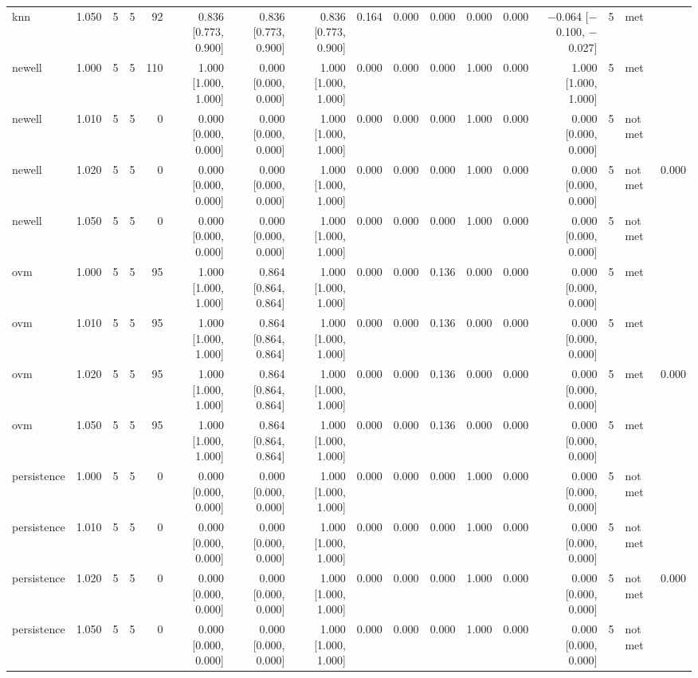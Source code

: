 \begin{table}[htbp]
{\begin{tabular}{lrrrrrrrrrrrrrrlr}
knn & 1.050 & 5 & 5 & 92 & 0.836 [0.773, 0.900] & 0.836 [0.773, 0.900] & 0.836 [0.773, 0.900] & 0.164 & 0.000 & 0.000 & 0.000 & 0.000 & $-$0.064 [$-$0.100, $-$0.027] & 5 & met &  \\
newell & 1.000 & 5 & 5 & 110 & 1.000 [1.000, 1.000] & 0.000 [0.000, 0.000] & 1.000 [1.000, 1.000] & 0.000 & 0.000 & 0.000 & 1.000 & 0.000 & 1.000 [1.000, 1.000] & 5 & met &  \\
newell & 1.010 & 5 & 5 & 0 & 0.000 [0.000, 0.000] & 0.000 [0.000, 0.000] & 1.000 [1.000, 1.000] & 0.000 & 0.000 & 0.000 & 1.000 & 0.000 & 0.000 [0.000, 0.000] & 5 & not met &  \\
newell & 1.020 & 5 & 5 & 0 & 0.000 [0.000, 0.000] & 0.000 [0.000, 0.000] & 1.000 [1.000, 1.000] & 0.000 & 0.000 & 0.000 & 1.000 & 0.000 & 0.000 [0.000, 0.000] & 5 & not met & 0.000 \\
newell & 1.050 & 5 & 5 & 0 & 0.000 [0.000, 0.000] & 0.000 [0.000, 0.000] & 1.000 [1.000, 1.000] & 0.000 & 0.000 & 0.000 & 1.000 & 0.000 & 0.000 [0.000, 0.000] & 5 & not met &  \\
ovm & 1.000 & 5 & 5 & 95 & 1.000 [1.000, 1.000] & 0.864 [0.864, 0.864] & 1.000 [1.000, 1.000] & 0.000 & 0.000 & 0.136 & 0.000 & 0.000 & 0.000 [0.000, 0.000] & 5 & met &  \\
ovm & 1.010 & 5 & 5 & 95 & 1.000 [1.000, 1.000] & 0.864 [0.864, 0.864] & 1.000 [1.000, 1.000] & 0.000 & 0.000 & 0.136 & 0.000 & 0.000 & 0.000 [0.000, 0.000] & 5 & met &  \\
ovm & 1.020 & 5 & 5 & 95 & 1.000 [1.000, 1.000] & 0.864 [0.864, 0.864] & 1.000 [1.000, 1.000] & 0.000 & 0.000 & 0.136 & 0.000 & 0.000 & 0.000 [0.000, 0.000] & 5 & met & 0.000 \\
ovm & 1.050 & 5 & 5 & 95 & 1.000 [1.000, 1.000] & 0.864 [0.864, 0.864] & 1.000 [1.000, 1.000] & 0.000 & 0.000 & 0.136 & 0.000 & 0.000 & 0.000 [0.000, 0.000] & 5 & met &  \\
persistence & 1.000 & 5 & 5 & 0 & 0.000 [0.000, 0.000] & 0.000 [0.000, 0.000] & 1.000 [1.000, 1.000] & 0.000 & 0.000 & 0.000 & 1.000 & 0.000 & 0.000 [0.000, 0.000] & 5 & not met &  \\
persistence & 1.010 & 5 & 5 & 0 & 0.000 [0.000, 0.000] & 0.000 [0.000, 0.000] & 1.000 [1.000, 1.000] & 0.000 & 0.000 & 0.000 & 1.000 & 0.000 & 0.000 [0.000, 0.000] & 5 & not met &  \\
persistence & 1.020 & 5 & 5 & 0 & 0.000 [0.000, 0.000] & 0.000 [0.000, 0.000] & 1.000 [1.000, 1.000] & 0.000 & 0.000 & 0.000 & 1.000 & 0.000 & 0.000 [0.000, 0.000] & 5 & not met & 0.000 \\
persistence & 1.050 & 5 & 5 & 0 & 0.000 [0.000, 0.000] & 0.000 [0.000, 0.000] & 1.000 [1.000, 1.000] & 0.000 & 0.000 & 0.000 & 1.000 & 0.000 & 0.000 [0.000, 0.000] & 5 & not met &  \\
\bottomrule
\end{tabular}
}
\end{table}
